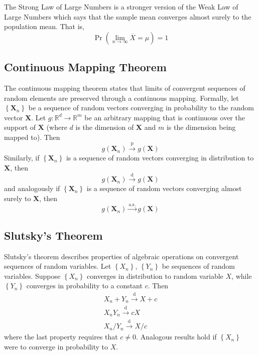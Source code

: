 \documentclass[11pt]{report} %
\begin{document}
The Strong Law of Large Numbers is a stronger version of the Weak Law of Large Numbers which says that the sample mean converges almost surely to the population mean. That is,
\begin{equation}
\operatorname{Pr}\left(\lim_{n\rightarrow\infty}\overline{X} = \mu\right) = 1
\end{equation}

\subsection{Continuous Mapping Theorem}

The continuous mapping theorem states that limits of convergent sequences of random elements are preserved through a continuous mapping. Formally, let $\left\{\mathbf{X}_{n}\right\}$ be a sequence of random vectors converging in probability to the random vector $\mathbf{X}$. Let $g: \mathbb{R}^{d} \to \mathbb{R}^{m}$ be an arbitrary mapping that is continuous over the support of $\mathbf{X}$ (where $d$ is the dimension of $\mathbf{X}$ and $m$ is the dimension being mapped to). Then
\begin{equation}
g\left(\mathbf{X}_{n}\right) \overset{\mathrm{p}}\to g\left(\mathbf{X}\right)
\end{equation}
Similarly, if $\left\{\mathbf{X}_{n}\right\}$ is a sequence of random vectors converging in distribution to $\mathbf{X}$, then
\begin{equation}
g\left(\mathbf{X}_{n}\right) \overset{\mathrm{d}}\to g\left(\mathbf{X}\right)
\end{equation}
and analogously if $\left\{\mathbf{X}_{n}\right\}$ is a sequence of random vectors converging almost surely to $\mathbf{X}$, then
\begin{equation}
g\left(\mathbf{X}_{n}\right) \overset{\mathrm{a.s.}}\to g\left(\mathbf{X}\right)
\end{equation}

\subsection{Slutsky's Theorem}

Slutsky's theorem describes properties of algebraic operations on convergent sequences of random variables. Let $\left\{X_{n}\right\}$, $\left\{Y_{n}\right\}$ be sequences of random variables. Suppose $\left\{X_{n}\right\}$ converges in distribution to random variable $X$, while $\left\{Y_{n}\right\}$ converges in probability to a constant $c$. Then
\begin{gather}
X_{n} + Y_{n} \overset{\mathrm{d}}{\to} X + c \\
X_{n}Y_{n} \overset{\mathrm{d}}{\to} cX \\
X_{n}/Y_{n} \overset{\mathrm{d}}{\to} X/c
\end{gather}
where the last property requires that $c\neq 0$. Analogous results hold if $\left\{X_{n}\right\}$ were to converge in probability to $X$.
\end{document}
